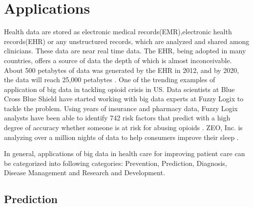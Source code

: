 \documentclass[sigconf]{acmart}
\begin{document}
\section{Applications}

Health data are stored as electronic medical records(EMR),electronic health records(EHR) or any unstructured records, which are analyzed and shared among clinicians. These data are near real time data. The EHR, being adopted in many countries, offers a source of data the depth of which is almost inconceivable. About 500 petabytes of data was generated by the EHR in 2012, and by 2020, the data will reach 25,000 petabytes \cite{www-ghdonline-org}. One of the trending examples of application of big data in tackling opioid crisis in US.
Data scientists at Blue Cross Blue Shield have started working with big data experts at Fuzzy Logix to tackle the problem. Using years of insurance and pharmacy data, Fuzzy Logix analysts have been able to identify 742 risk factors that predict with a high degree of accuracy whether someone is at risk for abusing opioids \cite{www-datapine-com}. ZEO, Inc. is analyzing over a million nights of data to help consumers improve their sleep \cite{www-ghdonline-org}.

In general, applications of big data in health care for improving patient care can be categorized into following categories: Prevention, Prediction, Diagnosis, Disease Management and Research and Development.

\subsection{Prediction}
\end{document}
